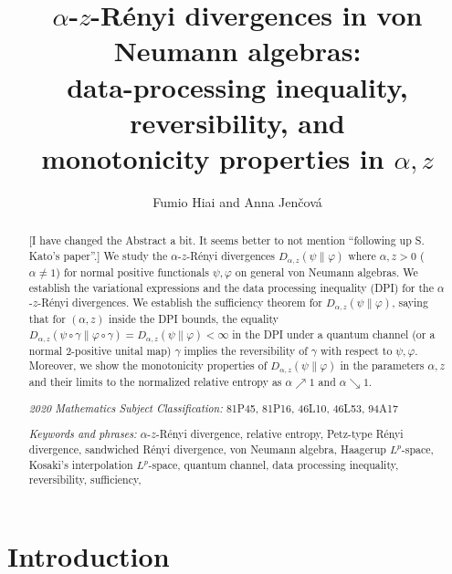 \documentclass[12pt]{article}
\title{
$\alpha$-$z$-R\'enyi divergences in von Neumann algebras: \\
data-processing inequality, reversibility, and \\
monotonicity properties in $\alpha,z$}
\author{Fumio Hiai and Anna Jen\v cov\'a}
\theoremstyle{definition}
\theoremstyle{remark}
\numberwithin{equation}{section}
\def\ffi{\varphi}
\begin{document}
\maketitle

\begin{abstract}
{\color{blue}[I have changed the Abstract a bit. It seems better to not mention ``following up S. Kato's paper''.]
We study the $\alpha$-$z$-R\'enyi divergences $D_{\alpha,z}(\psi\|\ffi)$ where $\alpha,z>0$ ($\alpha\ne1$)
for normal positive functionals $\psi,\ffi$ on general von Neumann algebras. We establish the variational
expressions and the data processing inequality (DPI) for the $\alpha$-$z$-R\'enyi divergences. We
establish the sufficiency theorem for $D_{\alpha,z}(\psi\|\ffi)$, saying that for $(\alpha,z)$ inside the DPI
bounds, the equality $D_{\alpha,z}(\psi\circ\gamma\|\ffi\circ\gamma)=D_{\alpha,z}(\psi\|\ffi)<\infty$ in the
DPI under a quantum channel (or a normal $2$-positive unital map) $\gamma$ implies the reversibility of
$\gamma$ with respect to $\psi,\ffi$. Moreover, we show the monotonicity properties of
$D_{\alpha,z}(\psi\|\ffi)$ in the parameters $\alpha,z$ and their limits to the normalized relative entropy as
$\alpha\nearrow1$ and $\alpha\searrow1$.}

\bigskip\noindent
{\it 2020 Mathematics Subject Classification:}
81P45, 81P16, 46L10, 46L53, 94A17

\medskip\noindent
{\it Keywords and phrases:}
$\alpha$-$z$-R\'enyi divergence,
relative entropy,
Petz-type R\'enyi divergence,
sandwiched R\'enyi divergence,
von Neumann algebra,
Haagerup $L^p$-space,
Kosaki's interpolation $L^p$-space,
quantum channel,
data processing inequality,
reversibility,
sufficiency,

\end{abstract}



\section{Introduction}
\end{document}
